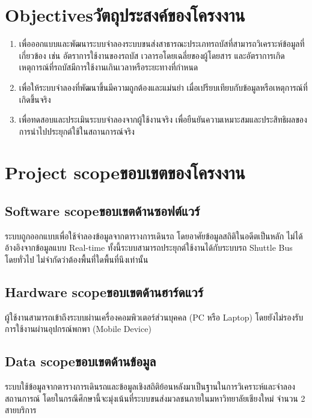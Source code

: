 \section{\ifenglish Objectives\else วัตถุประสงค์ของโครงงาน\fi}
\begin{enumerate}
    \item เพื่อออกแบบและพัฒนาระบบจำลองระบบขนส่งสาธารณะประเภทรถบัสที่สามารถวิเคราะห์ข้อมูลที่เกี่ยวข้อง เช่น อัตราการใช้งานของรถบัส เวลารอโดยเฉลี่ยของผู้โดยสาร และอัตราการเกิดเหตุการณ์ที่รถบัสมีการใช้งานเกินเวลาหรือระยะทางที่กำหนด
    \item เพื่อให้ระบบจำลองที่พัฒนาขึ้นมีความถูกต้องและแม่นยำ เมื่อเปรียบเทียบกับข้อมูลหรือเหตุการณ์ที่เกิดขึ้นจริง 
    \item เพื่อทดสอบและประเมินระบบจำลองจากผู้ใช้งานจริง เพื่อยืนยันความเหมาะสมและประสิทธิผลของการนำไปประยุกต์ใช้ในสถานการณ์จริง
\end{enumerate}

\section{\ifenglish Project scope\else ขอบเขตของโครงงาน\fi}

\subsection{\ifenglish Software scope\else ขอบเขตด้านซอฟต์แวร์\fi}
    \begin{mypara}
        \indent ระบบถูกออกแบบเพื่อใช้จำลองข้อมูลจากตารางการเดินรถ โดยอาศัยข้อมูลสถิติในอดีตเป็นหลัก 
        ไม่ได้อ้างอิงจากข้อมูลแบบ Real-time ทั้งนี้ระบบสามารถประยุกต์ใช้งานได้กับระบบรถ 
        Shuttle Bus โดยทั่วไป ไม่จำกัดว่าต้องพื้นที่ใดพื้นที่นึงเท่านั้น
    \end{mypara}
\subsection{\ifenglish Hardware scope\else ขอบเขตด้านฮาร์ดแวร์\fi}
    \begin{mypara}
        \indent ผู้ใช้งานสามารถเข้าถึงระบบผ่านเครื่องคอมพิวเตอร์ส่วนบุคคล (PC หรือ Laptop)
         โดยยังไม่รองรับการใช้งานผ่านอุปกรณ์พกพา (Mobile Device)
    \end{mypara}
\subsection{\ifenglish Data scope\else ขอบเขตด้านข้อมูล\fi}
    \begin{mypara}
        \indent ระบบใช้ข้อมูลจากตารางการเดินรถและข้อมูลเชิงสถิติย้อนหลังมาเป็นฐานในการวิเคราะห์และจำลองสถานการณ์ 
        โดยในกรณีศึกษานี้จะมุ่งเน้นที่ระบบขนส่งมวลชนภายในมหาวิทยาลัยเชียงใหม่ จำนวน 2 สายบริการ
    \end{mypara}
